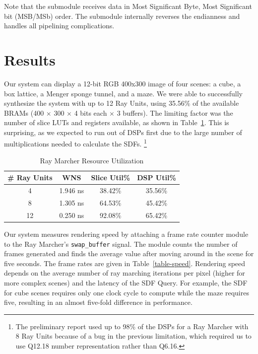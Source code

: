 \documentclass[conference]{IEEEtran}
\begin{document}
Note that the submodule receives data in Most Significant Byte, Most Significant bit (MSB/MSb) order. The submodule internally reverses the endianness and handles all pipelining complications.


\section{Results}

Our system can display a 12-bit RGB 400x300 image of four scenes: a cube, a box lattice, a Menger sponge tunnel, and a maze. We were able to successfully synthesize the system with up to 12 Ray Units, using 35.56\% of the available BRAMs (400 $\times$ 300 $\times$ 4 bits each $\times$ 3 buffers). The limiting factor was the number of slice LUTs and registers available, as shown in Table~\ref{table-resource}. This is surprising, as we expected to run out of DSPs first due to the large number of multiplications needed to calculate the SDFs. \footnote{The preliminary report used up to 98\% of the DSPs for a Ray Marcher with 8 Ray Units because of a bug in the previous limitation, which required us to use Q12.18 number representation rather than Q6.16.}


\begin{table}[!t]
\renewcommand{\arraystretch}{1.3}
\caption{Ray Marcher Resource Utilization}
\label{table-resource}
\centering
\begin{tabular}{c||c|c|c}
\hline
\bfseries \# Ray Units & \bfseries WNS & \bfseries Slice Util\% & \bfseries DSP Util\% \\
\hline\hline
4 & 1.946 ns & 38.42\% & 35.56\% \\
8 & 1.305 ns & 64.53\% & 45.42\% \\
12 & 0.250 ns & 92.08\% & 65.42\% \\
\hline
\end{tabular}
\end{table}

Our system measures rendering speed by attaching a frame rate counter module to the Ray Marcher's \texttt{swap\_buffer} signal. The module counts the number of frames generated and finds the average value after moving around in the scene for five seconds. The frame rates are given in Table~\ref{table-speed}. Rendering speed depends on the average number of ray marching iterations per pixel (higher for more complex scenes) and the latency of the SDF Query. For example, the SDF for cube scenes requires only one clock cycle to compute while the maze requires five, resulting in an almost five-fold difference in performance.
\end{document}

